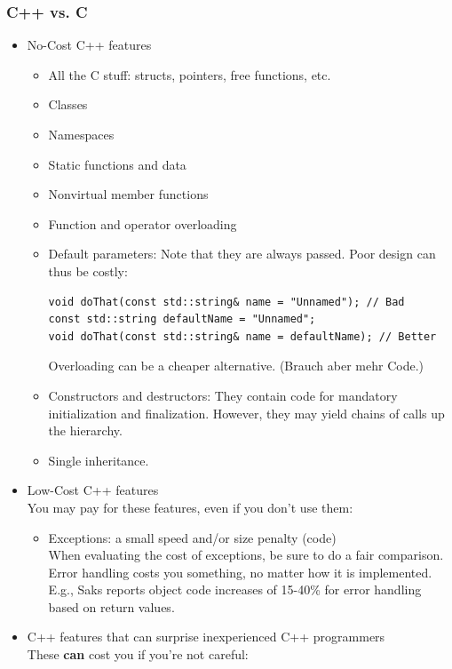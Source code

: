 \subsubsection{C++ vs. C}
\begin{itemize}
	\item No-Cost C++ features
		\begin{itemize}
			\item All the C stuff: structs, pointers, free functions, etc.
			\item Classes
			\item Namespaces
			\item Static functions and data
			\item Nonvirtual member functions
			\item Function and operator overloading
			\item Default parameters: Note that they are always passed. Poor design can thus be costly:
				\begin{lstlisting}
void doThat(const std::string& name = "Unnamed"); // Bad
const std::string defaultName = "Unnamed";
void doThat(const std::string& name = defaultName); // Better
				\end{lstlisting}
				Overloading can be a cheaper alternative. (Brauch aber mehr Code.)
			\item  Constructors and destructors: They contain code for mandatory initialization and finalization. However, they may yield chains of calls up the hierarchy.
			\item Single inheritance.
		\end{itemize}
	\item Low-Cost C++ features\\ You may pay for these features, even if you don't use them:
		\begin{itemize}
			\item Exceptions: a small speed and/or size penalty (code)\\
			When evaluating the cost of exceptions, be sure to do a fair comparison. Error handling costs you something, no matter how it is implemented.\\
			E.g., Saks reports object code increases of 15-40\% for error handling based on return values.
		\end{itemize}
	\item C++ features that can surprise inexperienced C++ programmers\\
	These \textbf{can} cost you if you're not careful:
		\begin{itemize}

\end{itemize}
\end{itemize}
